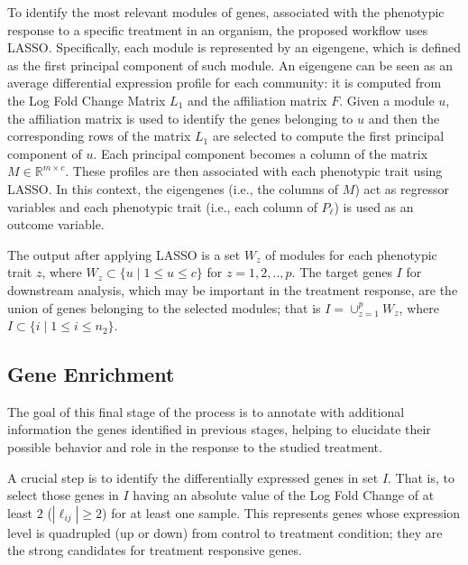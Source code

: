 \documentclass{bmcart}
\begin{document}
To identify the most relevant modules of genes, associated
with the phenotypic response to a specific treatment in an organism,
the proposed workflow uses LASSO. Specifically, each module is
represented by an eigengene, which is defined as the first principal
component of such module. An eigengene can be seen as an average
differential expression profile for each community: it is computed
from the Log Fold Change Matrix $L_1$ and the affiliation matrix
$F$. Given a module $u$, the affiliation matrix is used to identify
the genes belonging to $u$ and then the corresponding rows of the
matrix $L_1$ are selected to compute the first principal component of
$u$. Each principal component becomes a column of the matrix $M \in
\mathbb{R}^{m \times c}$.  These profiles are then associated with each
phenotypic trait using
LASSO.  In this context, the eigengenes (i.e., the columns
of $M$) act as regressor variables and each phenotypic trait (i.e.,
each column of $P_\ell$) is used as an outcome variable.
\vspace{0.5cm}

The output after applying LASSO is a set $W_z$ of modules for each
phenotypic trait $z$, where $W_z \subset \{u \mid 1 \leq u \leq c\}$
for $z= 1,2,..,p$. The target genes $I$ for downstream analysis, which
may be important in the treatment response, are the union of genes
belonging to the selected modules; that is $I = \cup_{z=1}^{p} W_z$,
where $I \subset \{i \mid 1 \leq i \leq n_2\}$.

\subsection*{Gene Enrichment}

The goal of this final stage of the process is to annotate with
additional information the genes identified in previous stages,
helping to elucidate their possible behavior and role in the response
to the studied treatment.
\vspace{0.5cm}

A crucial step is to identify the differentially expressed genes in
set $I$. That is, to select those genes in $I$ having an absolute
value of the Log Fold Change of at least $2$ ($|\ell_{ij}|\geq 2$) for
at least one sample. This represents genes whose expression level is
quadrupled (up or down) from control to treatment condition; they are the
strong candidates for treatment responsive genes.
\vspace{0.5cm}
\end{document}
